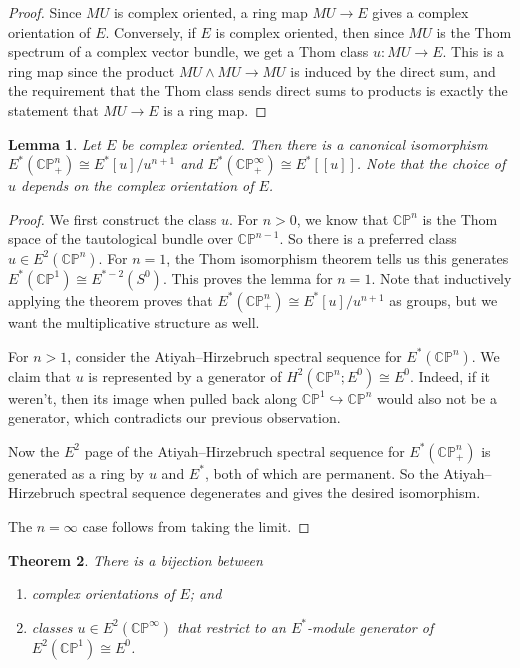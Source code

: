 \documentclass{shortart}
\newtheorem{thm}{Theorem}[section]
\newtheorem{lemma}[thm]{Lemma}
\theoremstyle{definition}
\newcommand\CP{\mathbb{CP}}
\begin{document}
\begin{proof}
  Since $MU$ is complex oriented, a ring map $MU \to E$ gives a complex orientation of $E$. Conversely, if $E$ is complex oriented, then since $MU$ is the Thom spectrum of a complex vector bundle, we get a Thom class $u: MU \to E$. This is a ring map since the product $MU \wedge MU \to MU$ is induced by the direct sum, and the requirement that the Thom class sends direct sums to products is exactly the statement that $MU \to E$ is a ring map. 
\end{proof}

\begin{lemma}
  Let $E$ be complex oriented. Then there is a canonical isomorphism $E^*(\CP^n_+) \cong E^*[u]/u^{n + 1}$ and $E^*(\CP^\infty_+) \cong E^*[\![u]\!]$. Note that the choice of $u$ depends on the complex orientation of $E$.
\end{lemma}

\begin{proof}
  We first construct the class $u$. For $n > 0$, we know that $\CP^n$ is the Thom space of the tautological bundle over $\CP^{n - 1}$. So there is a preferred class $u \in E^2(\CP^n)$. For $n = 1$, the Thom isomorphism theorem tells us this generates $E^*(\CP^1) \cong E^{* - 2}(S^0)$. This proves the lemma for $n = 1$. Note that inductively applying the theorem proves that $E^*(\CP^n_+) \cong E^*[u]/u^{n + 1}$ as groups, but we want the multiplicative structure as well.

  For $n > 1$, consider the Atiyah--Hirzebruch spectral sequence for $E^*(\CP^n)$. We claim that $u$ is represented by a generator of $H^2(\CP^n; E^0) \cong E^0$. Indeed, if it weren't, then its image when pulled back along $\CP^1 \hookrightarrow \CP^n$ would also not be a generator, which contradicts our previous observation.

  Now the $E^2$ page of the Atiyah--Hirzebruch spectral sequence for $E^*(\CP^n_+)$ is generated as a ring by $u$ and $E^*$, both of which are permanent. So the Atiyah--Hirzebruch spectral sequence degenerates and gives the desired isomorphism.

  The $n = \infty$ case follows from taking the limit.
\end{proof}

\begin{thm}
  There is a bijection between
  \begin{enumerate}
    \item complex orientations of $E$; and
    \item classes $u \in E^2(\CP^\infty)$ that restrict to an $E^*$-module generator of $E^2(\CP^1) \cong E^0$.
  \end{enumerate}
\end{thm}
\end{document}

